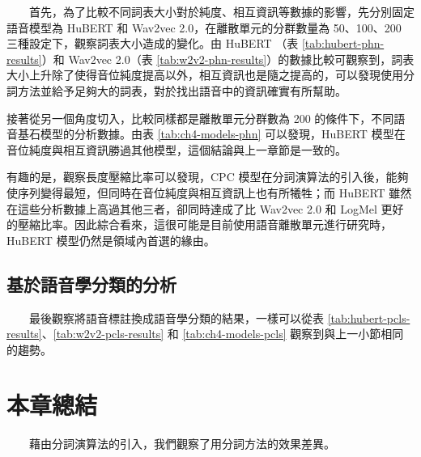 　　首先，為了比較不同詞表大小對於純度、相互資訊等數據的影響，先分別固定語音模型為 HuBERT 和 Wav2vec 2.0，在離散單元的分群數量為 50、100、200 三種設定下，觀察詞表大小造成的變化。由 HuBERT （表 \ref{tab:hubert-phn-results}）和 Wav2vec 2.0（表 \ref{tab:w2v2-phn-results}）的數據比較可觀察到，詞表大小上升除了使得音位純度提高以外，相互資訊也是隨之提高的，可以發現使用分詞方法並給予足夠大的詞表，對於找出語音中的資訊確實有所幫助。  

        接著從另一個角度切入，比較同樣都是離散單元分群數為 200 的條件下，不同語音基石模型的分析數據。由表 \ref{tab:ch4-models-phn} 可以發現，HuBERT 模型在音位純度與相互資訊勝過其他模型，這個結論與上一章節是一致的。

        有趣的是，觀察長度壓縮比率可以發現，CPC 模型在分詞演算法的引入後，能夠使序列變得最短，但同時在音位純度與相互資訊上也有所犧牲；而 HuBERT 雖然在這些分析數據上高過其他三者，卻同時達成了比 Wav2vec 2.0 和 LogMel 更好的壓縮比率。因此綜合看來，這很可能是目前使用語音離散單元進行研究時，HuBERT 模型仍然是領域內首選的緣由。

\subsection{基於語音學分類的分析}

　　最後觀察將語音標註換成語音學分類的結果，一樣可以從表 \ref{tab:hubert-pcls-results}、\ref{tab:w2v2-pcls-results} 和 \ref{tab:ch4-models-pcls} 觀察到與上一小節相同的趨勢。   

               
\section{本章總結}

　　藉由分詞演算法的引入，我們觀察了用分詞方法的效果差異。
